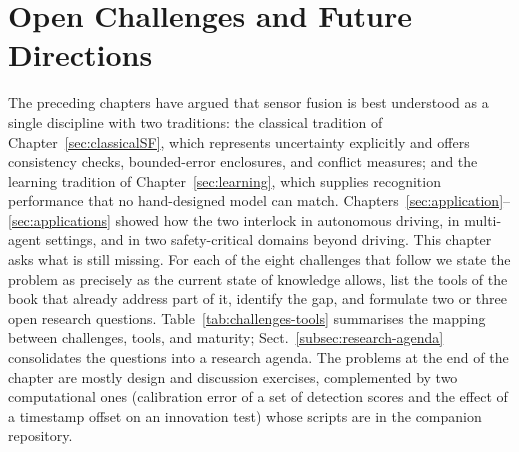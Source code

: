 \chapter{Open Challenges and Future Directions}
\label{sec:open-challenges}


\suppressfloats[t]

The preceding chapters have argued that sensor fusion is best understood as a single discipline with two traditions: the classical tradition of Chapter~\ref{sec:classicalSF}, which represents uncertainty explicitly and offers consistency checks, bounded-error enclosures, and conflict measures; and the learning tradition of Chapter~\ref{sec:learning}, which supplies recognition performance that no hand-designed model can match. Chapters~\ref{sec:application}--\ref{sec:applications} showed how the two interlock in autonomous driving, in multi-agent settings, and in two safety-critical domains beyond driving. This chapter asks what is still missing. For each of the eight challenges that follow we state the problem as precisely as the current state of knowledge allows, list the tools of the book that already address part of it, identify the gap, and formulate two or three open research questions. Table~\ref{tab:challenges-tools} summarises the mapping between challenges, tools, and maturity; Sect.~\ref{subsec:research-agenda} consolidates the questions into a research agenda. The problems at the end of the chapter are mostly design and discussion exercises, complemented by two computational ones (calibration error of a set of detection scores and the effect of a timestamp offset on an innovation test) whose scripts are in the companion repository.

